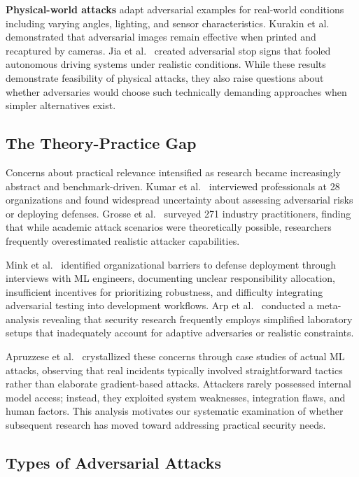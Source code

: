 \documentclass[11pt,a4paper]{article}
\begin{document}
\textbf{Physical-world attacks} adapt adversarial examples for real-world conditions including varying angles, lighting, and sensor characteristics. Kurakin et al.~\citep{kurakin2016adversarial} demonstrated that adversarial images remain effective when printed and recaptured by cameras. Jia et al.~\citep{jia2022physical} created adversarial stop signs that fooled autonomous driving systems under realistic conditions. While these results demonstrate feasibility of physical attacks, they also raise questions about whether adversaries would choose such technically demanding approaches when simpler alternatives exist.

\subsection{The Theory-Practice Gap}

Concerns about practical relevance intensified as research became increasingly abstract and benchmark-driven. Kumar et al.~\citep{kumar2020adversarial} interviewed professionals at 28 organizations and found widespread uncertainty about assessing adversarial risks or deploying defenses. Grosse et al.~\citep{grosse2024practical} surveyed 271 industry practitioners, finding that while academic attack scenarios were theoretically possible, researchers frequently overestimated realistic attacker capabilities.

Mink et al.~\citep{mink2023barriers} identified organizational barriers to defense deployment through interviews with ML engineers, documenting unclear responsibility allocation, insufficient incentives for prioritizing robustness, and difficulty integrating adversarial testing into development workflows. Arp et al.~\citep{arp2022dos} conducted a meta-analysis revealing that security research frequently employs simplified laboratory setups that inadequately account for adaptive adversaries or realistic constraints.

Apruzzese et al.~\citep{apruzzese2022real} crystallized these concerns through case studies of actual ML attacks, observing that real incidents typically involved straightforward tactics rather than elaborate gradient-based attacks. Attackers rarely possessed internal model access; instead, they exploited system weaknesses, integration flaws, and human factors. This analysis motivates our systematic examination of whether subsequent research has moved toward addressing practical security needs.

\subsection{Types of Adversarial Attacks}
\end{document}
